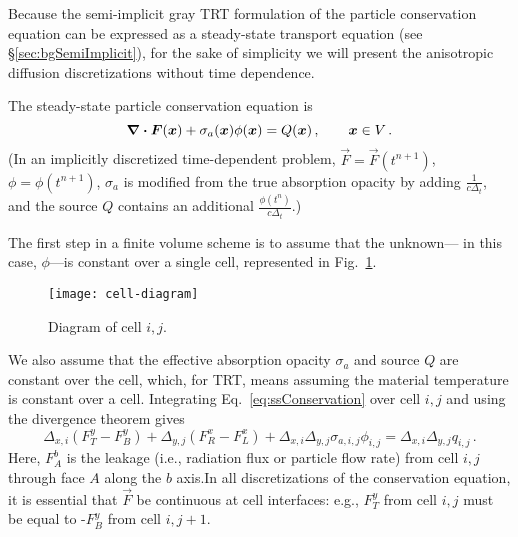Because the semi-implicit gray TRT formulation of the particle conservation
equation can be expressed as a steady-state transport equation (see
\S\ref{sec:bgSemiImplicit}), for the sake of simplicity we will present the
anisotropic diffusion discretizations without time dependence.

The steady-state particle conservation equation is
\begin{equation}\label{eq:ssConservation}
  \bm{\nabla} \bm{\cdot} \bm{F}(\bm{x}) + \sigma_a(\bm{x}) \phi(\bm{x}) =
  Q(\bm{x})\,,\qquad \bm{x} \in V\,.
\end{equation}
(In an implicitly discretized time-dependent problem,
$\vec{F}=\vec{F}(t^{n+1})$, $\phi=\phi(t^{n+1})$, $\sigma_a$ is modified from
the true absorption opacity by adding $\frac{1}{c\Delta_t}$, and the source $Q$
contains an additional $\frac{\phi(t^{n})}{c\Delta_t}$.) 

The first step in a finite volume scheme is to assume that the unknown---%
in this case, $\phi$---is constant over a single cell, represented in
Fig.~\ref{fig:cellDiagram}. 
%
\begin{figure}[tb]
  \centering
  \texttt{[image: cell-diagram]}
  \caption{Diagram of cell $i,j$.}
  \label{fig:cellDiagram}
\end{figure}
%
We also assume that the effective absorption opacity $\sigma_a$ and source $Q$
are
constant over the cell, which, for TRT, means assuming the material temperature
is constant over a cell. Integrating Eq.~\eqref{eq:ssConservation} over cell
$i,j$ and using the divergence theorem gives
\begin{equation} \label{eq:ssConservationDisc}
  \Delta_{x,i} \left( F_T^y - F_B^y \right)
+ \Delta_{y,j} \left( F_R^x - F_L^x \right)
+ \Delta_{x,i}\Delta_{y,j} \sigma_{a,i,j} \phi_{i,j}
= \Delta_{x,i}\Delta_{y,j} q_{i,j}\,.
\end{equation}
Here, $F_A^b$ is the leakage (i.e., radiation flux or particle flow rate) from
cell $i,j$ through face $A$
along the $b$ axis.In all discretizations of the conservation equation, it is essential that
$\vec{F}$ be continuous at cell interfaces: e.g., $F_T^y$ from cell $i,j$ must
be equal to -$F_B^y$ from cell $i,{j+1}$.

